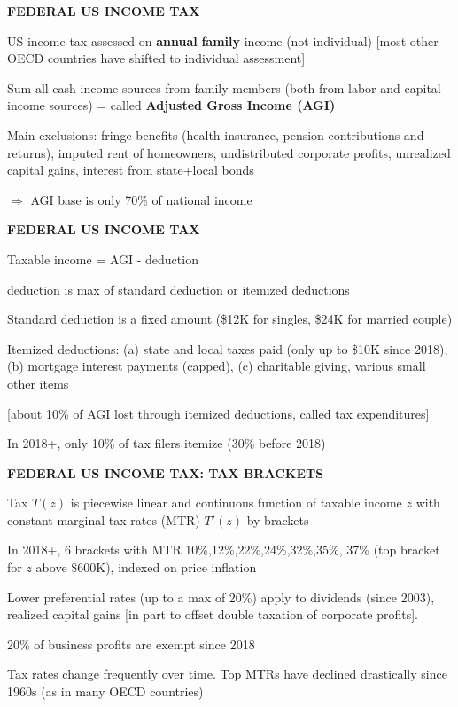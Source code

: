 \documentclass[landscape]{slides}
\begin{document}
\begin{slide}
\begin{center}
{\bf FEDERAL US INCOME TAX}
\end{center}

US income tax assessed on {\bf annual} {\bf family} income (not
individual) [most other OECD countries have shifted to individual
assessment]

Sum all cash income sources from family members (both from labor
and capital income sources) = called {\bf Adjusted Gross Income
(AGI)}

Main exclusions: fringe benefits (health insurance, pension
contributions and returns), imputed rent of homeowners, undistributed corporate profits, unrealized capital gains, interest from state+local bonds 

$\Rightarrow$ AGI base is only 70\% of national income

\end{slide}


\begin{slide}
\begin{center}
{\bf FEDERAL US INCOME TAX}
\end{center}

Taxable income = AGI - deduction


deduction is max of standard deduction or itemized deductions

Standard deduction is a fixed amount 
(\$12K for singles, \$24K for married couple)

Itemized deductions: (a) state and local taxes paid (only up to \$10K since 2018), (b) mortgage interest payments (capped), (c) charitable giving,  various small other items

[about 10\% of AGI lost through itemized deductions, called tax
expenditures]

In 2018+, only 10\% of tax filers itemize (30\% before 2018)

\end{slide}


\begin{slide}
\begin{center}
{\bf FEDERAL US INCOME TAX: TAX BRACKETS}
\end{center}

Tax $T(z)$ is piecewise linear and continuous function of taxable
income $z$ with constant marginal tax rates (MTR) $T'(z)$ by
brackets

In 2018+, 6 brackets with MTR 10\%,12\%,22\%,24\%,32\%,35\%, 37\% (top
bracket for $z$ above \$600K), indexed on price inflation

Lower preferential rates (up to a max of 20\%) apply to dividends
(since 2003), realized capital gains [in part to offset double
taxation of corporate profits].

20\% of business profits are exempt since 2018

Tax rates change frequently over time. Top MTRs have declined
drastically since 1960s (as in many OECD countries)
\end{slide}
\end{document}
